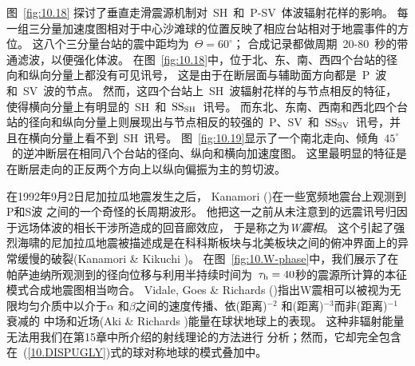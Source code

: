 图~\ref{fig:10.18} 探讨了垂直走滑震源机制对~SH~和~P-SV~体波辐射花样的影响。
每一组三分量加速度图相对于中心沙滩球的位置反映了相应台站相对于地震事件的方位。
这八个三分量台站的震中距均为~$\Theta=60^\circ$；
合成记录都做周期~20-80~秒的带通滤波，以便强化体波。
在图~\ref{fig:10.18}中，位于北、东、南、西四个台站的径向和纵向分量上都没有可见讯号，
这是由于在断层面与辅助面方向都是~P~波和~SV~波的节点。
然而，这四个台站上~SH~波辐射花样的与节点相反的特征，
使得横向分量上有明显的~SH~和~${\rm SS}_{\rm SH}$~讯号。 而东北、东南、西南和西北四个台站的径向和纵向分量上则展现出与节点相反的较强的~P、SV~和~${\rm SS}_{\rm SV}$~讯号，并且在横向分量上看不到~SH~讯号。
图~\ref{fig:10.19}显示了一个南北走向、倾角~$45^{\circ}$~的逆冲断层在相同八个台站的径向、纵向和横向加速度图。
这里最明显的特征是在断层走向的正反两个方向上以纵向偏振为主的剪切波。

在1992年9月2日尼加拉瓜地震发生之后，
%
Kanamori (\citeyear{kanamori93})在一些宽频地震台上观测到P和S波
之间的一个奇怪的长周期波形。
他把这一之前从未注意到的远震讯号归因于远场体波的相长干涉所造成的回音廊效应，
于是称之为{\em W震相\/}。
%
%
这个引起了强烈海啸的尼加拉瓜地震被描述成是在科科斯板块与北美板块之间的俯冲界面上的异常缓慢的破裂(Kanamori \& Kikuchi \citeyear{kanamori&kikuchi93})。
在图~\ref{fig:10.W-phase}中，我们展示了在
帕萨迪纳所观测到的径向位移与利用半持续时间为~$\tau_{\rm h}=40$秒的震源所计算的本征模式合成地震图相当吻合。
Vidale, Goes \& Richards (\citeyear{vidale&al95})指出W震相可以被视为无限均匀介质中以介于$\alpha$ 和$\beta$之间的速度传播、依(距离)$^{-2}$ 和(距离)$^{-3}$而非(距离)$^{-1}$衰减的
中场和近场(Aki \& Richards \citeyear{aki&richards80})能量在球状地球上的表现。
这种非辐射能量无法用我们在第15章中所介绍的射线理论的方法进行
分析；然而，它却完全包含在~(\ref{10.DISPUGLY})式的球对称地球的模式叠加中。

